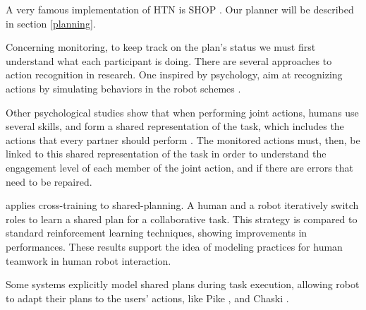 \documentclass{llncs}
\begin{document}
A very famous implementation of HTN is SHOP \cite{Nau99}. Our planner will be described in section \ref{planning}.


Concerning monitoring, to keep track on the plan's status we must first understand what each participant is doing. There are several approaches to action recognition in research. One inspired by psychology, aim at recognizing actions by simulating behaviors in the robot schemes \cite{gray2005action} \cite{demiris2006hierarchical}.


Other psychological studies show that when performing joint actions, humans use several skills, and form a shared representation of the task, which includes the actions that every partner should perform \cite{sebanz2006joint}. The monitored actions must, then, be linked to this shared representation of the task in order to understand the engagement level of each member of the joint action, and if there are errors that need to be repaired. 

\cite{nikolaidis2013human} applies cross-training  to shared-planning. A human and a robot iteratively switch roles to learn a shared plan for a collaborative task. This strategy is compared to standard reinforcement learning techniques, showing improvements in performances. These results support the idea of modeling practices for human teamwork in human robot interaction.

Some systems explicitly model shared plans during task execution, allowing robot to adapt their plans to the users' actions, like Pike \cite{levine2014concurrent,karpas2015robust}, and Chaski \cite{shah2011improved}.
\end{document}
